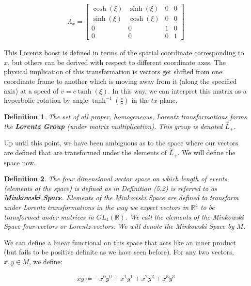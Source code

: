 \documentclass[10pt]{ucthesis}
\newcommand{\R}{\mathbb{R}}
\newtheorem{definition}{Definition}[chapter]
\begin{document}
\begin{equation}
\begin{aligned}
	\Lambda_x = \begin{bmatrix}
						\cosh(\xi) & \sinh(\xi) & 0 & 0 \\
						\sinh(\xi) & \cosh(\xi) & 0 & 0 \\
						0&0&1&0\\
						0&0&0&1
					\end{bmatrix}
\end{aligned}
\end{equation}

This Lorentz boost is defined in terms of the spatial coordinate corresponding to $x$, but others can be derived with respect to different coordinate axes. The physical implication of this transformation is vectors get shifted from one coordinate frame to another which is moving away from it (along the specified axis) at a speed of $v=c\tanh(\xi)$. In this way, we can interpret this matrix as a hyperbolic rotation by angle $\tanh^{-1}(\frac{v}{c})$ in the $tx$-plane.

\begin{definition}
	The set of all proper, homogeneous, Lorentz transformations forms the \textbf{Lorentz Group} (under matrix multiplication). This group is denoted $\overset{\sim}{L}_+$.
\end{definition}

Up until this point, we have been ambiguous as to the space where our vectors are defined that are transformed under the elements of $\overset{\sim}{L}_+$. We will define the space now.

\begin{definition}
	The four dimensional vector space on which length of events (elements of the space) is defined as in Definition (5.2) is referred to as \textbf{Minkowski Space}. Elements of the Minkowski Space are defined to transform under Lorentz transformations in the way we expect vectors in $\R^4$ to be transformed under matrices in $GL_4(\R)$. We call the elements of the Minkowski Space four-vectors or Lorentz-vectors. We will denote the Minkowski Space by $M$.
\end{definition}


We can define a linear functional on this space that acts like an inner product (but fails to be positive definite as we have seen before). For any two vectors, $x,y\in M$, we define:

\begin{equation}
\begin{aligned}
	x\dot y \coloneq -x^0y^0 + x^1y^1 + x^2y^2 + x^3y^3
\end{aligned}
\end{equation}
\end{document}
